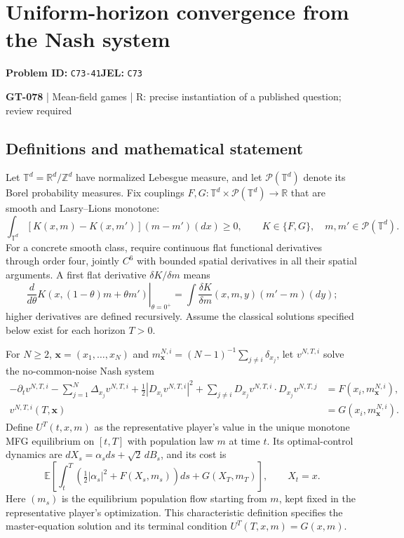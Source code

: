 \documentclass[11pt,a4paper]{article}
\begin{document}
\section*{Uniform-horizon convergence from the Nash system}
\textbf{Problem ID:} \texttt{C73-41}\quad \textbf{JEL:} \texttt{C73}\par
\label{problem:OP-0208}
\label{game:GT-078}
{\sffamily\small\color{muted}
{\small\textbf{GT-078} | Mean-field games | R: precise instantiation of a published question; review required\par}
\par}
\subsection*{Definitions and mathematical statement}
Let $\mathbb T^d=\mathbb R^d/\mathbb Z^d$ have normalized Lebesgue measure, and let $\mathcal P(\mathbb T^d)$ denote its Borel probability measures. Fix couplings $F,G:\mathbb T^d\times\mathcal P(\mathbb T^d)\to\mathbb R$ that are smooth and Lasry--Lions monotone:
\[
 \int_{\mathbb T^d}[K(x,m)-K(x,m')](m-m')(dx)\geq0,
 \qquad K\in\{F,G\},\quad m,m'\in\mathcal P(\mathbb T^d).
\]
For a concrete smooth class, require continuous flat functional derivatives through order four, jointly $C^6$ with bounded spatial derivatives in all their spatial arguments. A first flat derivative $\delta K/\delta m$ means
\[
 \left.\frac d{d\theta}K(x,(1-\theta)m+\theta m')\right|_{\theta=0^+}
 =\int\frac{\delta K}{\delta m}(x,m,y)(m'-m)(dy);
\]
higher derivatives are defined recursively. Assume the classical solutions specified below exist for each horizon $T>0$.

For $N\geq2$, $\boldsymbol x=(x_1,\ldots,x_N)$ and $m^{N,i}_{\boldsymbol x}=(N-1)^{-1}\sum_{j\ne i}\delta_{x_j}$, let $v^{N,T,i}$ solve the no-common-noise Nash system
\[
 \begin{split}
 -\partial_t v^{N,T,i}-\sum_{j=1}^N\Delta_{x_j}v^{N,T,i}
 +\tfrac12|D_{x_i}v^{N,T,i}|^2
 +\sum_{j\ne i}D_{x_j}v^{N,T,i}\cdot D_{x_j}v^{N,T,j}
 &=F(x_i,m^{N,i}_{\boldsymbol x}),\\
 v^{N,T,i}(T,\boldsymbol x)&=G(x_i,m^{N,i}_{\boldsymbol x}).
 \end{split}
\]
Define $U^T(t,x,m)$ as the representative player's value in the unique monotone MFG equilibrium on $[t,T]$ with population law $m$ at time $t$. Its optimal-control dynamics are $dX_s=\alpha_s ds+\sqrt2\,dB_s$, and its cost is
\[
 \mathbb E\!\left[\int_t^T\left(\tfrac12|\alpha_s|^2+F(X_s,m_s)\right)ds
 +G(X_T,m_T)\right],\qquad X_t=x.
\]
Here $(m_s)$ is the equilibrium population flow starting from $m$, kept fixed in the representative player's optimization. This characteristic definition specifies the master-equation solution and its terminal condition $U^T(T,x,m)=G(x,m)$.
\end{document}
